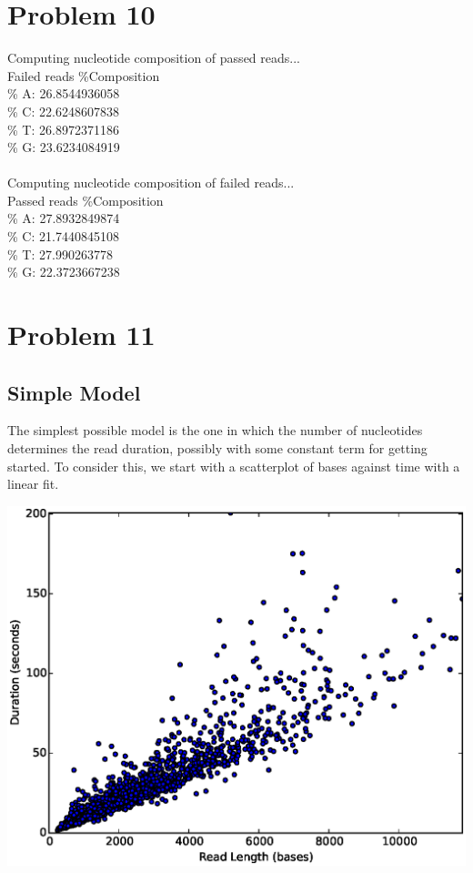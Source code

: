 \documentclass[11pt]{article}
\begin{document}
\section*{Problem 10}
Computing nucleotide composition of passed reads...\\
Failed reads \%Composition\\
\% A: 26.8544936058\\
\% C: 22.6248607838\\
\% T: 26.8972371186\\
\% G: 23.6234084919\\
\\
Computing nucleotide composition of failed reads...\\
Passed reads \%Composition\\
\% A: 27.8932849874\\
\% C: 21.7440845108\\
\% T: 27.990263778\\
\% G: 22.3723667238\\
\section*{Problem 11}
\subsection*{Simple Model}

        The simplest possible model is the one in which the number of nucleotides determines the read duration,
        possibly with some constant term for getting started.  To consider this, we start with a scatterplot of
        bases against time with a linear fit.

        \begin{centering}
        \includegraphics[width=\textwidth]{part11scatterbd}
        \end{centering}
\end{document}
